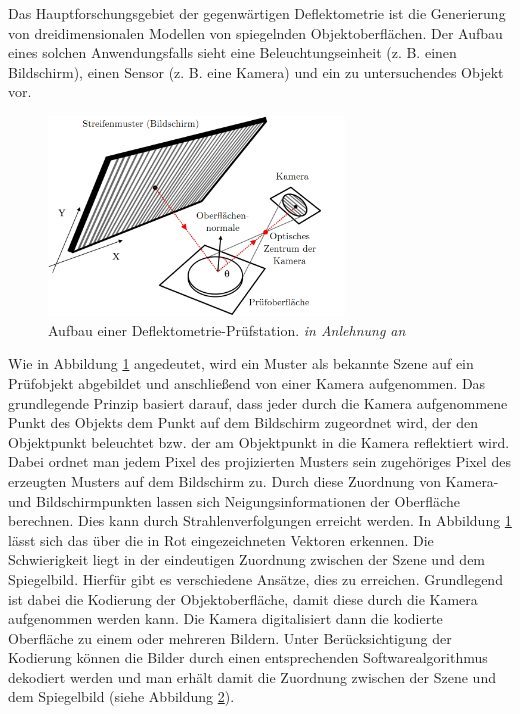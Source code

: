 Das Hauptforschungsgebiet der gegenwärtigen Deflektometrie ist die Generierung von dreidimensionalen Modellen von spiegelnden Objektoberflächen.
Der Aufbau eines solchen Anwendungsfalls sieht eine Beleuchtungseinheit (z. B. einen Bildschirm), einen Sensor (z. B. eine Kamera) und ein zu untersuchendes Objekt vor.

\begin{figure}[H]
	\centering
	\includegraphics[width=0.7\textwidth]{02_grundlagenDerDeflektometrie/rekonstruktion/figures/nature-articel-nr1}
	\caption[Aufbau einer Deflektometrie-Prüfstation]{Aufbau einer Deflektometrie-Prüfstation. \textit{in Anlehnung an} \cite{aufbau}}
	\label{img:aufbau}
\end{figure}

\noindent
Wie in Abbildung \ref{img:aufbau} angedeutet, wird ein Muster als bekannte Szene auf ein Prüfobjekt abgebildet und anschließend von einer Kamera aufgenommen.
Das grundlegende Prinzip basiert darauf, dass jeder durch die Kamera aufgenommene Punkt des Objekts dem Punkt auf dem Bildschirm zugeordnet wird, der den Objektpunkt beleuchtet bzw. der am Objektpunkt in die Kamera reflektiert wird.
Dabei ordnet man jedem Pixel des projizierten Musters sein zugehöriges Pixel des erzeugten Musters auf dem Bildschirm zu.
Durch diese Zuordnung von Kamera- und Bildschirmpunkten lassen sich Neigungsinformationen der Oberfläche berechnen.
Dies kann durch Strahlenverfolgungen erreicht werden.
In Abbildung \ref{img:aufbau} lässt sich das über die in Rot eingezeichneten Vektoren erkennen.
Die Schwierigkeit liegt in der eindeutigen Zuordnung zwischen der Szene und dem Spiegelbild.
Hierfür gibt es verschiedene Ansätze, dies zu erreichen.
Grundlegend ist dabei die Kodierung der Objektoberfläche, damit diese durch die Kamera aufgenommen werden kann.
Die Kamera digitalisiert dann die kodierte Oberfläche zu einem oder mehreren Bildern.
Unter Berücksichtigung der Kodierung können die Bilder durch einen entsprechenden Softwarealgorithmus dekodiert werden und man erhält damit die Zuordnung zwischen der Szene und dem Spiegelbild (siehe Abbildung \ref{tikz:abbKodierungUndDekodierung}).
%
{
	\begin{figure}[H]
		\centering
		
		\label{tikz:abbKodierungUndDekodierung}
	\end{figure}
}

